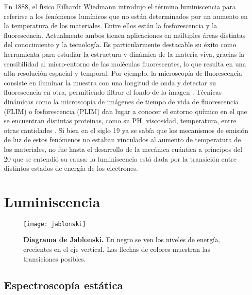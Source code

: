 En 1888, el físico Eilhardt Wiedmann introdujo el término luminiscencia para referirse a los fenómenos lumínicos que no están determinados por un aumento en la temperatura de los materiales.
Entre ellos están la fosforescencia y la fluorescencia.
Actualmente ambos tienen aplicaciones en múltiples áreas distintas del conocimiento y la tecnología. 
Es particularmente destacable su éxito como herramienta para estudiar la estructura y dinámica de la materia viva, gracias la sensibilidad al micro-entorno de las moléculas fluorescentes, lo que resulta en una alta resolución espacial y temporal. 
Por ejemplo, la microscopía de fluorescencia consiste en iluminar la muestra con una longitud de onda y detectar su fluorescencia en otra, permitiendo filtrar el fondo de la imagen \cite{valeur_introduction_2012}.
Técnicas dinámicas como la microscopía de imágenes de tiempo de vida de fluorescencia (FLIM) o fosforescencia (PLIM) dan lugar a conocer el entorno químico en el que se encuentran distintas proteinas, como su PH, viscosidad, temperatura, entre otras cantidades \cite{suhling_fluorescence_2015} \cite{baggaley_timeresolved_2015}.
Si bien en el siglo 19 ya se sabía que los mecanismos de emisión de luz de estos fenómenos no estaban vinculados al aumento de temperatura de los materiales, no fue hasta el desarrollo de la mecánica cuántica a principos del 20 que se entendió su causa: la luminiscencia está dada por la transición entre distintos estados de energía de los electrones.

\section{Luminiscencia}


\begin{figure}
    \centering
    \texttt{[image: jablonski]}
    \caption{\textbf{Diagrama de Jablonski.} En negro se ven los niveles de energía, crecientes en el eje vertical. Las flechas de colores muestran las transiciones posibles.}
    \label{fig:jablonski}
\end{figure}

\subsection{Espectroscopía estática}

